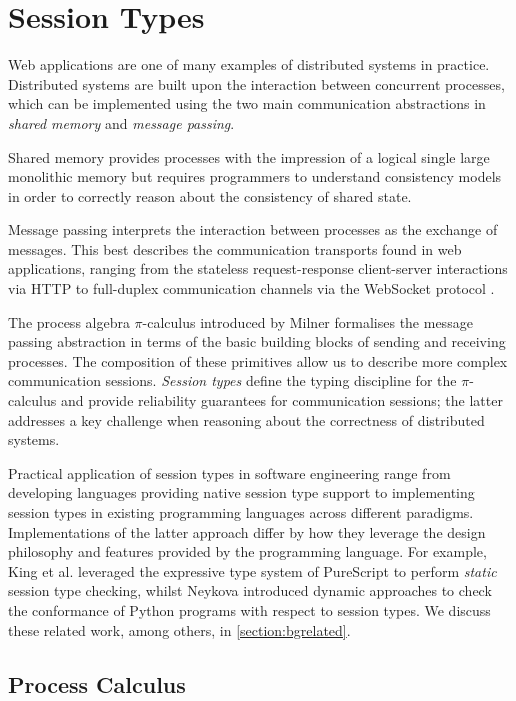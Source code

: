 \section{Session Types}
\label{section:sessiontypes}

Web applications are one of many examples of 
distributed systems in practice. 
Distributed systems are built upon the interaction 
between concurrent processes, which can be implemented using 
the two main communication abstractions in 
\textit{shared memory} and \textit{message passing}. 

Shared memory provides processes with the impression of 
a logical single large monolithic memory 
but requires programmers to understand consistency models 
in order to correctly reason about the consistency of shared state.

Message passing interprets the interaction between processes 
as the exchange of messages.
This best describes the communication transports 
found in web applications, ranging from the 
stateless request-response client-server interactions via HTTP 
to full-duplex communication channels via the WebSocket protocol 
\cite{WebSocketRFC}.

The process algebra $\pi$-calculus 
introduced by Milner \cite{Milner1999} 
formalises the message passing abstraction in terms of 
the basic building blocks of sending and receiving processes.
The composition of these primitives allow us to 
describe more complex communication sessions.
\textit{Session types} define the typing discipline 
for the $\pi$-calculus and provide reliability guarantees 
for communication sessions; 
the latter addresses a key challenge when 
reasoning about the correctness of distributed systems. 

Practical application of session types in software
engineering range from
developing languages providing native session type support 
\cite{ATS2016} to implementing session types 
in existing programming languages across different paradigms.
Implementations of the latter approach differ by 
how they leverage the design philosophy and features 
provided by the programming language.
For example, King et al. \cite{PureScript2019} leveraged the 
expressive type system of PureScript to perform 
\textit{static} session type checking,
whilst Neykova \cite{Python2017} 
introduced dynamic approaches to 
check the conformance of Python programs 
with respect to session types.
We discuss these related work, among others, 
in \cref{section:bgrelated}.

\subsection{Process Calculus}
\label{subsection:picalculus}


